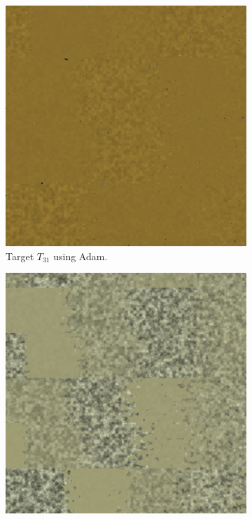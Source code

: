 \begin{figure}
\centering
\begin{subfigure}[t]{.25\textwidth}
    \centering
    \includegraphics[width=\linewidth]{img/evaluation/M3/2 param/SBL_Adam_2param_final.png}
    \caption{Target $T_{31}$ using Adam.}
    \label{fig:M3SBLFinalRendersTwoParamAdam}
\end{subfigure}\hspace{0.7cm}
\begin{subfigure}[t]{.25\textwidth}
    \centering
    \includegraphics[width=\linewidth]{img/evaluation/M3/random/SBL_Adam_random_final.png}

\end{subfigure}
\end{figure}
